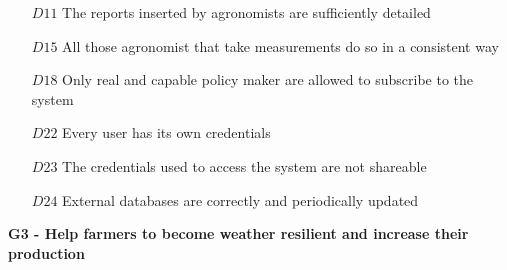 \documentclass[10pt]{report}
\begin{document}
\begin{itemize}
    \item [$D11$] The reports inserted by agronomists are sufficiently detailed
    \item [$D15$] All those agronomist that take measurements do so in a consistent way
    \item [$D18$] Only real and capable policy maker are allowed to subscribe to the system
    \item [$D22$] Every user has its own credentials
    \item [$D23$] The credentials used to access the system are not shareable
    \item [$D24$] External databases are correctly and periodically updated
\end{itemize}

\textbf{G3 - Help farmers to become weather resilient and increase their production}
\end{document}
